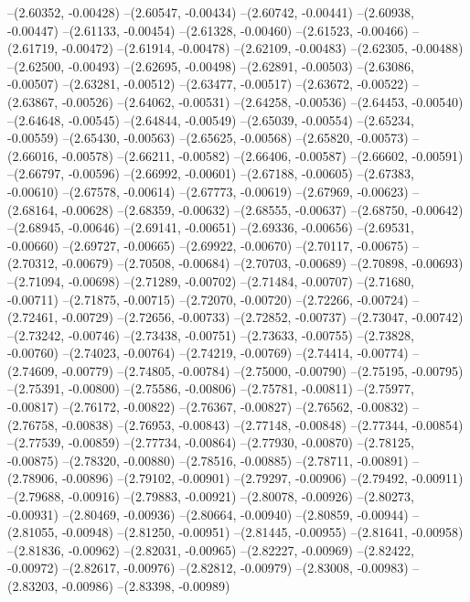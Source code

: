 --(2.60352, -0.00428)
--(2.60547, -0.00434)
--(2.60742, -0.00441)
--(2.60938, -0.00447)
--(2.61133, -0.00454)
--(2.61328, -0.00460)
--(2.61523, -0.00466)
--(2.61719, -0.00472)
--(2.61914, -0.00478)
--(2.62109, -0.00483)
--(2.62305, -0.00488)
--(2.62500, -0.00493)
--(2.62695, -0.00498)
--(2.62891, -0.00503)
--(2.63086, -0.00507)
--(2.63281, -0.00512)
--(2.63477, -0.00517)
--(2.63672, -0.00522)
--(2.63867, -0.00526)
--(2.64062, -0.00531)
--(2.64258, -0.00536)
--(2.64453, -0.00540)
--(2.64648, -0.00545)
--(2.64844, -0.00549)
--(2.65039, -0.00554)
--(2.65234, -0.00559)
--(2.65430, -0.00563)
--(2.65625, -0.00568)
--(2.65820, -0.00573)
--(2.66016, -0.00578)
--(2.66211, -0.00582)
--(2.66406, -0.00587)
--(2.66602, -0.00591)
--(2.66797, -0.00596)
--(2.66992, -0.00601)
--(2.67188, -0.00605)
--(2.67383, -0.00610)
--(2.67578, -0.00614)
--(2.67773, -0.00619)
--(2.67969, -0.00623)
--(2.68164, -0.00628)
--(2.68359, -0.00632)
--(2.68555, -0.00637)
--(2.68750, -0.00642)
--(2.68945, -0.00646)
--(2.69141, -0.00651)
--(2.69336, -0.00656)
--(2.69531, -0.00660)
--(2.69727, -0.00665)
--(2.69922, -0.00670)
--(2.70117, -0.00675)
--(2.70312, -0.00679)
--(2.70508, -0.00684)
--(2.70703, -0.00689)
--(2.70898, -0.00693)
--(2.71094, -0.00698)
--(2.71289, -0.00702)
--(2.71484, -0.00707)
--(2.71680, -0.00711)
--(2.71875, -0.00715)
--(2.72070, -0.00720)
--(2.72266, -0.00724)
--(2.72461, -0.00729)
--(2.72656, -0.00733)
--(2.72852, -0.00737)
--(2.73047, -0.00742)
--(2.73242, -0.00746)
--(2.73438, -0.00751)
--(2.73633, -0.00755)
--(2.73828, -0.00760)
--(2.74023, -0.00764)
--(2.74219, -0.00769)
--(2.74414, -0.00774)
--(2.74609, -0.00779)
--(2.74805, -0.00784)
--(2.75000, -0.00790)
--(2.75195, -0.00795)
--(2.75391, -0.00800)
--(2.75586, -0.00806)
--(2.75781, -0.00811)
--(2.75977, -0.00817)
--(2.76172, -0.00822)
--(2.76367, -0.00827)
--(2.76562, -0.00832)
--(2.76758, -0.00838)
--(2.76953, -0.00843)
--(2.77148, -0.00848)
--(2.77344, -0.00854)
--(2.77539, -0.00859)
--(2.77734, -0.00864)
--(2.77930, -0.00870)
--(2.78125, -0.00875)
--(2.78320, -0.00880)
--(2.78516, -0.00885)
--(2.78711, -0.00891)
--(2.78906, -0.00896)
--(2.79102, -0.00901)
--(2.79297, -0.00906)
--(2.79492, -0.00911)
--(2.79688, -0.00916)
--(2.79883, -0.00921)
--(2.80078, -0.00926)
--(2.80273, -0.00931)
--(2.80469, -0.00936)
--(2.80664, -0.00940)
--(2.80859, -0.00944)
--(2.81055, -0.00948)
--(2.81250, -0.00951)
--(2.81445, -0.00955)
--(2.81641, -0.00958)
--(2.81836, -0.00962)
--(2.82031, -0.00965)
--(2.82227, -0.00969)
--(2.82422, -0.00972)
--(2.82617, -0.00976)
--(2.82812, -0.00979)
--(2.83008, -0.00983)
--(2.83203, -0.00986)
--(2.83398, -0.00989)
